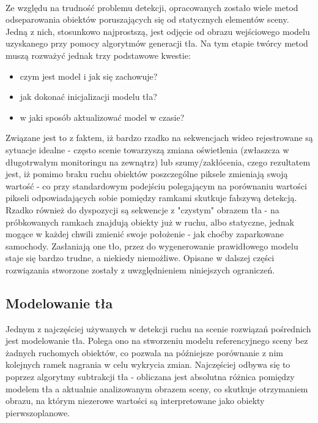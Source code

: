 \paragraph{}
Ze względu na trudność problemu detekcji, opracowanych zostało wiele metod odseparowania obiektów poruszających się od statycznych elementów sceny. Jedną z nich, stosunkowo najprostszą, jest odjęcie od obrazu wejściowego modelu uzyskanego przy pomocy algorytmów generacji tła. Na tym etapie twórcy metod muszą rozważyć jednak trzy podstawowe kwestie:
\begin{itemize}
\item czym jest model i jak się zachowuje?
\item jak dokonać inicjalizacji modelu tła?
\item w jaki sposób aktualizować model w czasie?
\end{itemize}
Związane jest to z faktem, iż bardzo rzadko na sekwencjach wideo rejestrowane są sytuacje idealne - często scenie towarzyszą zmiana oświetlenia (zwłaszcza w długotrwałym monitoringu na zewnątrz) lub szumy/zakłócenia, czego rezultatem jest, iż pomimo braku ruchu obiektów poszczególne piksele zmieniają swoją wartość - co przy standardowym podejściu polegającym na porównaniu wartości pikseli odpowiadających sobie pomiędzy ramkami skutkuje fałszywą detekcją. Rzadko również do dyspozycji są sekwencje z "czystym" obrazem tła - na próbkowanych ramkach znajdują obiekty już w ruchu, albo statyczne, jednak mogące w każdej chwili zmienić swoje położenie - jak choćby zaparkowane samochody. Zasłaniają one tło, przez do wygenerowanie prawidłowego modelu staje się bardzo trudne, a niekiedy niemożliwe. Opisane w dalszej części rozwiązania stworzone zostały z uwzględnieniem niniejszych ograniczeń.
\subsection{Modelowanie tła}
Jednym z najczęściej używanych w detekcji ruchu na scenie rozwiązań pośrednich jest modelowanie tła. Polega ono na stworzeniu modelu referencyjnego sceny bez żadnych ruchomych obiektów, co pozwala na późniejsze porównanie z nim kolejnych ramek nagrania w celu wykrycia zmian. Najczęściej odbywa się to poprzez algorytmy subtrakcji tła - obliczana jest absolutna różnica pomiędzy modelem tła a aktualnie analizowanym obrazem sceny, co skutkuje otrzymaniem obrazu, na którym niezerowe wartości są interpretowane jako obiekty pierwszoplanowe.
